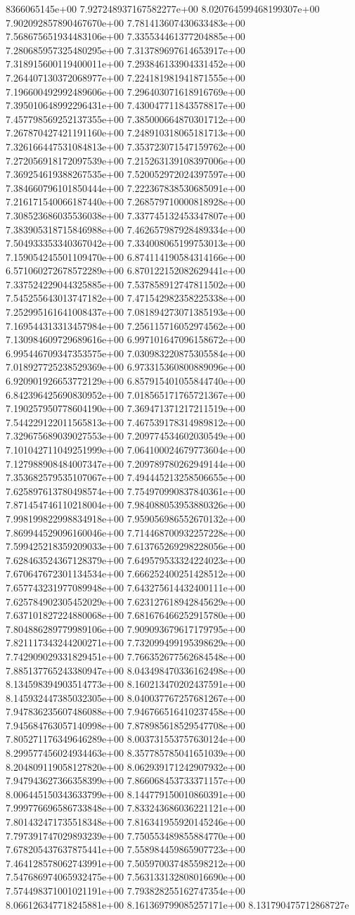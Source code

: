 8366065145e+00	7.927248937167582277e+00	8.020764599468199307e+00	7.902092857890467670e+00	7.781413607430633483e+00	7.568675651934483106e+00	7.335534461377204885e+00	7.280685957325480295e+00	7.313789697614653917e+00	7.318915600119400011e+00	7.293846133904331452e+00	7.264407130372068977e+00	7.224181981941871555e+00	7.196600492992489606e+00	7.296403071618916769e+00	7.395010648992296431e+00	7.430047711843578817e+00	7.457798569252137355e+00	7.385000664870301712e+00	7.267870427421191160e+00	7.248910318065181713e+00	7.326166447531084813e+00	7.353723071547159762e+00	7.272056918172097539e+00	7.215263139108397006e+00	7.369254619388267535e+00	7.520052972024397597e+00	7.384660796101850444e+00	7.222367838530685091e+00	7.216171540066187440e+00	7.268579710000818928e+00	7.308523686035536038e+00	7.337745132453347807e+00	7.383905318715846988e+00	7.462657987928489334e+00	7.504933353340367042e+00	7.334008065199753013e+00	7.159054245501109470e+00	6.874114190584314166e+00	6.571060272678572289e+00	6.870122152082629441e+00	7.337524229044325885e+00	7.537858912747811502e+00	7.545255643013747182e+00	7.471542982358225338e+00	7.252995161641008437e+00	7.081894273071385193e+00	7.169544313313457984e+00	7.256115716052974562e+00	7.130984609729689616e+00	6.997101647096158672e+00	6.995446709347353575e+00	7.030983220875305584e+00	7.018927725238529369e+00	6.973315360800889096e+00	6.920901926653772129e+00	6.857915401055844740e+00	6.842396425690830952e+00	7.018565171765721367e+00	7.190257950778604190e+00	7.369471371217211519e+00	7.544229122011565813e+00	7.467539178314989812e+00	7.329675689039027553e+00	7.209774534602030549e+00	7.101042711049251999e+00	7.064100024679773604e+00	7.127988908484007347e+00	7.209789780262949144e+00	7.353682579535107067e+00	7.494445213258506655e+00	7.625897613780498574e+00	7.754970990837840361e+00	7.871454746110218004e+00	7.984088053953880326e+00	7.998199822998834918e+00	7.959056986552670132e+00	7.869944529096160046e+00	7.714468700932257228e+00	7.599425218359209033e+00	7.613765269298228056e+00	7.628463524367128379e+00	7.649579533324224023e+00	7.670647672301134534e+00	7.666252400251428512e+00	7.657743231977089948e+00	7.643275614432400111e+00	7.625784902305452029e+00	7.623127618942845629e+00	7.637101827224880068e+00	7.681676466252915780e+00	7.804886289779989106e+00	7.909093679617179795e+00	7.821117343244200271e+00	7.732099499195398629e+00	7.742909029331829451e+00	7.766352677562684548e+00	7.885137765243380947e+00	8.043498470336162498e+00	8.134598394903514773e+00	8.160213470202437591e+00	8.145932447385032305e+00	8.040037767257681267e+00	7.947836235607486088e+00	7.946766516410237458e+00	7.945684763057140998e+00	7.878985618529547708e+00	7.805271176349646289e+00	8.003731553757630124e+00	8.299577456024934463e+00	8.357785785041651039e+00	8.204809119058127820e+00	8.062939171242907932e+00	7.947943627366358399e+00	7.866068453733371157e+00	8.006445150343633799e+00	8.144779150010860391e+00	7.999776696586733848e+00	7.833243686036221121e+00	7.801432471735518348e+00	7.816341955920145246e+00	7.797391747029893239e+00	7.750553489855884770e+00	7.678205437637875441e+00	7.558984459865907723e+00	7.464128578062743991e+00	7.505970037485598212e+00	7.547686974065932475e+00	7.563133132808016690e+00	7.574498371001021191e+00	7.793828255162747354e+00	8.066126347718245881e+00	8.161369799085257171e+00	8.131790475712868727e